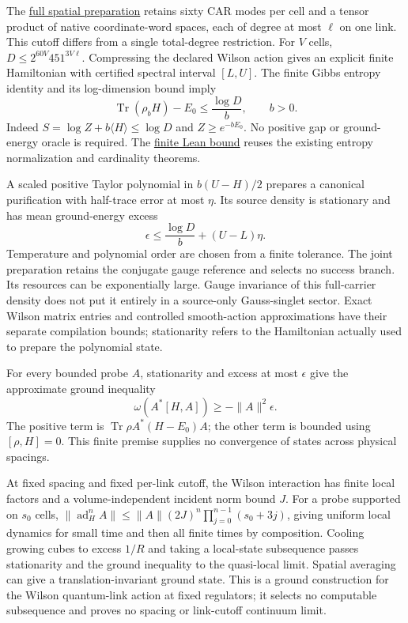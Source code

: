 The \href{https://github.com/FloatingPragma/observer-patch-holography/blob/main/model/particle_spatial_ground_state/PROOF.md}{full spatial preparation}
retains sixty CAR modes per cell and a tensor product of native coordinate-word
spaces, each of degree at most $\ell$ on one link. This cutoff differs from
a single total-degree restriction. For $V$ cells,
$D\le 2^{60V}451^{3V\ell}$. Compressing the declared Wilson action gives
an explicit finite Hamiltonian with certified spectral interval $[L,U]$.
The finite Gibbs entropy identity and its log-dimension bound imply
\[
 \operatorname{Tr}(\rho_bH)-E_0\le\frac{\log D}{b},\qquad b>0.
\]
Indeed $S=\log Z+b\langle H\rangle\le\log D$ and
$Z\ge e^{-bE_0}$. No positive gap or ground-energy oracle is required.
The \href{https://github.com/FloatingPragma/observer-patch-holography/blob/main/Lean/Thermodynamics/GapFreeCooling.lean}{finite Lean bound}
reuses the existing entropy normalization and cardinality theorems.

A scaled positive Taylor polynomial in $b(U-H)/2$ prepares a canonical
purification with half-trace error at most $\eta$. Its source density is
stationary and has mean ground-energy excess
\[
 \epsilon\le\frac{\log D}{b}+(U-L)\eta.
\]
Temperature and polynomial order are chosen from a finite tolerance.
The joint preparation retains the conjugate gauge reference and selects
no success branch. Its resources can be exponentially large. Gauge
invariance of this full-carrier density does not put it entirely in a
source-only Gauss-singlet sector. Exact Wilson matrix entries and
controlled smooth-action approximations have their separate compilation
bounds; stationarity refers to the Hamiltonian actually used to prepare
the polynomial state.

For every bounded probe $A$, stationarity and excess at most $\epsilon$
give the approximate ground inequality
\[
 \omega(A^*[H,A])\ge-\|A\|^2\epsilon.
\]
The positive term is $\operatorname{Tr}\rho A^*(H-E_0)A$; the other term
is bounded using $[\rho,H]=0$. This finite premise supplies no convergence
of states across physical spacings.

At fixed spacing and fixed per-link cutoff, the Wilson interaction has
finite local factors and a volume-independent incident norm bound $J$.
For a probe supported on $s_0$ cells,
$\|\operatorname{ad}_H^n A\|\le\|A\|(2J)^n
\prod_{j=0}^{n-1}(s_0+3j)$, giving uniform local dynamics for small time
and then all finite times by composition. Cooling growing cubes to excess
$1/R$ and taking a local-state subsequence passes stationarity and the
ground inequality to the quasi-local limit. Spatial averaging can give
a translation-invariant ground state. This is a ground construction for
the Wilson quantum-link action at fixed regulators; it selects no
computable subsequence and proves no spacing or link-cutoff continuum
limit.

